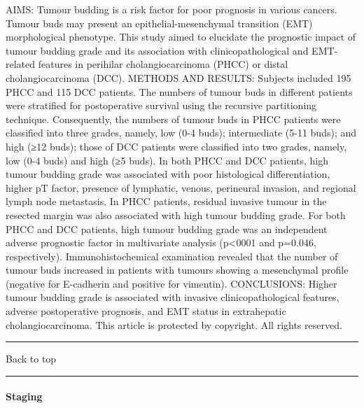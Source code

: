 \documentclass[]{article}
\let\oldparagraph\paragraph
\renewcommand{\paragraph}[1]{\oldparagraph{#1}\mbox{}}
\begin{document}
AIMS: Tumour budding is a risk factor for poor prognosis in various
cancers. Tumour buds may present an epithelial-mesenchymal transition
(EMT) morphological phenotype. This study aimed to elucidate the
prognostic impact of tumour budding grade and its association with
clinicopathological and EMT-related features in perihilar
cholangiocarcinoma (PHCC) or distal cholangiocarcinoma (DCC). METHODS
AND RESULTS: Subjects included 195 PHCC and 115 DCC patients. The
numbers of tumour buds in different patients were stratified for
postoperative survival using the recursive partitioning technique.
Consequently, the numbers of tumour buds in PHCC patients were
classified into three grades, namely, low (0-4 buds); intermediate (5-11
buds); and high (≥12 buds); those of DCC patients were classified into
two grades, namely, low (0-4 buds) and high (≥5 buds). In both PHCC and
DCC patients, high tumour budding grade was associated with poor
histological differentiation, higher pT factor, presence of lymphatic,
venous, perineural invasion, and regional lymph node metastasis. In PHCC
patients, residual invasive tumour in the resected margin was also
associated with high tumour budding grade. For both PHCC and DCC
patients, high tumour budding grade was an independent adverse
prognostic factor in multivariate analysis (p\textless{}0001 and
p=0.046, respectively). Immunohistochemical examination revealed that
the number of tumour buds increased in patients with tumours showing a
mesenchymal profile (negative for E-cadherin and positive for vimentin).
CONCLUSIONS: Higher tumour budding grade is associated with invasive
clinicopathological features, adverse postoperative prognosis, and EMT
status in extrahepatic cholangiocarcinoma. This article is protected by
copyright. All rights reserved.

{}

{}

\begin{center}\rule{0.5\linewidth}{\linethickness}\end{center}

Back to top

\begin{center}\rule{0.5\linewidth}{\linethickness}\end{center}

\pagebreak

\hypertarget{staging-1}{%
\paragraph{Staging}\label{staging-1}}
\end{document}
